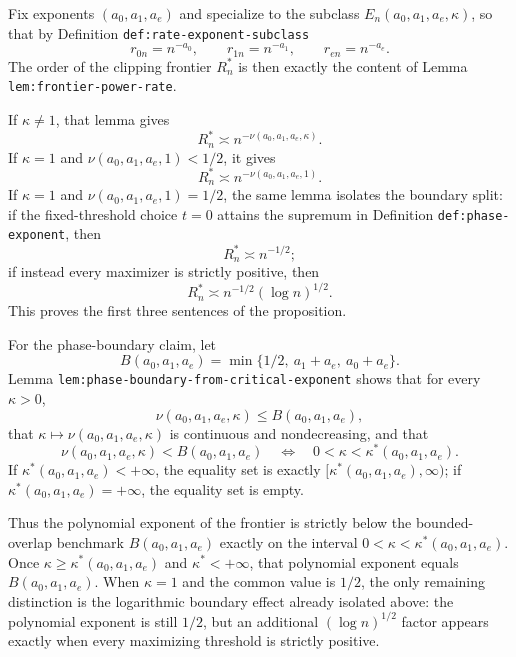 \documentclass{article}
\begin{document}
Fix exponents $(a_0,a_1,a_e)$ and specialize to the subclass $E_n(a_0,a_1,a_e,\kappa)$, so that by Definition \texttt{def:rate-exponent-subclass}
\[
r_{0n}=n^{-a_0},\qquad r_{1n}=n^{-a_1},\qquad r_{en}=n^{-a_e}.
\]
The order of the clipping frontier $R_n^*$ is then exactly the content of Lemma \texttt{lem:frontier-power-rate}.

If $\kappa\neq 1$, that lemma gives
\[
R_n^* \asymp n^{-\nu(a_0,a_1,a_e,\kappa)}.
\]
If $\kappa=1$ and $\nu(a_0,a_1,a_e,1)<1/2$, it gives
\[
R_n^* \asymp n^{-\nu(a_0,a_1,a_e,1)}.
\]
If $\kappa=1$ and $\nu(a_0,a_1,a_e,1)=1/2$, the same lemma isolates the boundary split: if the fixed-threshold choice $t=0$ attains the supremum in Definition \texttt{def:phase-exponent}, then
\[
R_n^* \asymp n^{-1/2};
\]
if instead every maximizer is strictly positive, then
\[
R_n^* \asymp n^{-1/2}(\log n)^{1/2}.
\]
This proves the first three sentences of the proposition.

For the phase-boundary claim, let
\[
B(a_0,a_1,a_e)=\min\{1/2,\ a_1+a_e,\ a_0+a_e\}.
\]
Lemma \texttt{lem:phase-boundary-from-critical-exponent} shows that for every $\kappa>0$,
\[
\nu(a_0,a_1,a_e,\kappa)\le B(a_0,a_1,a_e),
\]
that $\kappa\mapsto \nu(a_0,a_1,a_e,\kappa)$ is continuous and nondecreasing, and that
\[
\nu(a_0,a_1,a_e,\kappa) < B(a_0,a_1,a_e)
\quad\Longleftrightarrow\quad
0<\kappa<\kappa^*(a_0,a_1,a_e).
\]
If $\kappa^*(a_0,a_1,a_e)<+\infty$, the equality set is exactly $[\kappa^*(a_0,a_1,a_e),\infty)$; if $\kappa^*(a_0,a_1,a_e)=+\infty$, the equality set is empty.

Thus the polynomial exponent of the frontier is strictly below the bounded-overlap benchmark $B(a_0,a_1,a_e)$ exactly on the interval $0<\kappa<\kappa^*(a_0,a_1,a_e)$. Once $\kappa\ge \kappa^*(a_0,a_1,a_e)$ and $\kappa^*<+\infty$, that polynomial exponent equals $B(a_0,a_1,a_e)$. When $\kappa=1$ and the common value is $1/2$, the only remaining distinction is the logarithmic boundary effect already isolated above: the polynomial exponent is still $1/2$, but an additional $(\log n)^{1/2}$ factor appears exactly when every maximizing threshold is strictly positive.
\end{document}
